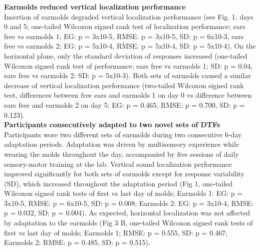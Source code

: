 \begin{multicols}{2}
\noindent %


\noindent \textbf{Earmolds reduced vertical localization performance}\\
Insertion of earmolds degraded vertical localization performance (see Fig. 1, days 0 and 5; one-tailed Wilcoxon signed rank test of localization performance; ears free vs earmolds 1; EG: p = 3x10-5, RMSE: p = 3x10-5, SD: p = 6x10-3, ears free vs earmolds 2; EG: p = 5x10-4, RMSE: p = 5x10-4, SD: p = 5x10-4). On the horizontal plane, only the standard deviation of responses increased (one-tailed Wilcoxon signed rank test of performance; ears free vs earmolds 1; SD: p = 0.04, ears free vs earmolds 2: SD: p = 5x10-3). Both sets of earmolds caused a similar decrease of vertical localization performance (two-tailed Wilcoxon signed rank test, differences between free ears and earmolds 1 on day 0 vs difference between ears free and earmolds 2 on day 5; EG: p = 0.465, RMSE: p = 0.700, SD: p = 0.123).\\ %
 
 \noindent\textbf{Participants consecutively adapted to two novel sets of DTFs}\\
Participants wore two different sets of earmolds during two consecutive 6-day adaptation periods. Adaptation was driven by multisensory experience while wearing the molds throughout the day, accompanied by five sessions of daily sensory-motor training at the lab. Vertical sound localization performance improved significantly for both sets of earmolds except for response variability (SD), which increased throughout the adaptation period (Fig 1, one-tailed Wilcoxon signed rank tests of first vs last day of molds; Earmolds 1: EG: p = 3x10-5, RMSE: p = 6x10-5, SD: p = 0.008; Earmolds 2: EG: p = 3x10-4, RMSE: p = 0.032, SD: p = 0.004). As expected, horizontal localization was not affected by adaptation to the earmolds (Fig 3 B, one-tailed Wilcoxon signed rank tests of first vs last day of molds; Earmolds 1; RMSE: p = 0.555, SD: p = 0.467; Earmolds 2; RMSE: p = 0.485, SD: p = 0.515).\\

\end{multicols} %
